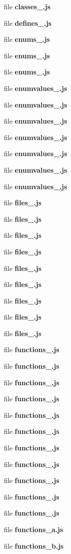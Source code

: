 \begin{DoxyCompactItemize}
file {\bf classes\+\_.\+js}
\item 
file {\bf defines\+\_.\+js}
\item 
file {\bf enums\+\_.\+js}
\item 
file {\bf enums\+\_.\+js}
\item 
file {\bf enums\+\_.\+js}
\item 
file {\bf enumvalues\+\_.\+js}
\item 
file {\bf enumvalues\+\_.\+js}
\item 
file {\bf enumvalues\+\_.\+js}
\item 
file {\bf enumvalues\+\_.\+js}
\item 
file {\bf enumvalues\+\_.\+js}
\item 
file {\bf enumvalues\+\_.\+js}
\item 
file {\bf enumvalues\+\_.\+js}
\item 
file {\bf files\+\_.\+js}
\item 
file {\bf files\+\_.\+js}
\item 
file {\bf files\+\_.\+js}
\item 
file {\bf files\+\_.\+js}
\item 
file {\bf files\+\_.\+js}
\item 
file {\bf files\+\_.\+js}
\item 
file {\bf files\+\_.\+js}
\item 
file {\bf files\+\_.\+js}
\item 
file {\bf files\+\_.\+js}
\item 
file {\bf functions\+\_.\+js}
\item 
file {\bf functions\+\_.\+js}
\item 
file {\bf functions\+\_.\+js}
\item 
file {\bf functions\+\_.\+js}
\item 
file {\bf functions\+\_.\+js}
\item 
file {\bf functions\+\_.\+js}
\item 
file {\bf functions\+\_.\+js}
\item 
file {\bf functions\+\_.\+js}
\item 
file {\bf functions\+\_.\+js}
\item 
file {\bf functions\+\_.\+js}
\item 
file {\bf functions\+\_.\+js}
\item 
file {\bf functions\+\_\+a.\+js}
\item 
file {\bf functions\+\_\+b.\+js}

\end{DoxyCompactItemize}
